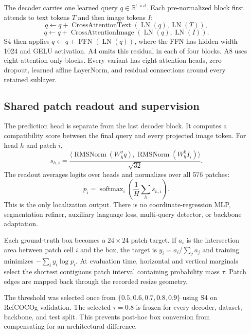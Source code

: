 \documentclass[conference]{IEEEtran}
\begin{document}
The decoder carries one learned query $q\in\mathbb{R}^{1\times d}$. Each pre-normalized block first attends to text tokens $T$ and then image tokens $I$:
\begin{equation}
q \leftarrow q+\operatorname{CrossAttentionText}(\operatorname{LN}(q),\operatorname{LN}(T)),
\end{equation}
\begin{equation}
q \leftarrow q+\operatorname{CrossAttentionImage}(\operatorname{LN}(q),\operatorname{LN}(I)).
\end{equation}
S4 then applies $q\leftarrow q+\operatorname{FFN}(\operatorname{LN}(q))$, where the FFN has hidden width 1024 and GELU activation. A4 omits this residual in each of four blocks. A8 uses eight attention-only blocks. Every variant has eight attention heads, zero dropout, learned affine LayerNorm, and residual connections around every retained sublayer.

\subsection{Shared patch readout and supervision}
The prediction head is separate from the last decoder block. It computes a compatibility score between the final query and every projected image token. For head $h$ and patch $i$,
\begin{equation}
s_{h,i}=\frac{\langle \operatorname{RMSNorm}(W^q_hq),\operatorname{RMSNorm}(W^k_hI_i)\rangle}{\sqrt{32}}.
\end{equation}
The readout averages logits over heads and normalizes over all 576 patches:
\begin{equation}
p_i=\operatorname{softmax}_i\left(\frac{1}{H}\sum_hs_{h,i}\right).
\end{equation}
This is the only localization output. There is no coordinate-regression MLP, segmentation refiner, auxiliary language loss, multi-query detector, or backbone adaptation.

Each ground-truth box becomes a $24\times24$ patch target. If $a_i$ is the intersection area between patch cell $i$ and the box, the target is $y_i=a_i/\sum_j a_j$ and training minimizes $-\sum_i y_i\log p_i$. At evaluation time, horizontal and vertical marginals select the shortest contiguous patch interval containing probability mass $\tau$. Patch edges are mapped back through the recorded resize geometry.

The threshold was selected once from $\{0.5,0.6,0.7,0.8,0.9\}$ using S4 on RefCOCOg validation. The selected $\tau=0.8$ is frozen for every decoder, dataset, backbone, and test split. This prevents post-hoc box conversion from compensating for an architectural difference.
\end{document}
